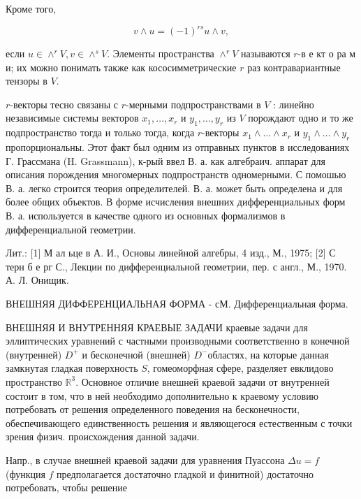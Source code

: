 \documentclass[10pt]{article}
\begin{document}
Кроме того,



\[

v \wedge u=(-1)^{r s} u \wedge v,

\]



если $u \in \wedge^{r} V, v \in \wedge^{s} V$. Элементы пространства $\wedge^{r} V$ называются $r$-в е кт о ра м и; их можно понимать также как кососимметрические $r$ раз контравариантные тензоры в $V$.



$r$-векторы тесно связаны с $r$-мерными подпространствами в $V$ : линейно независимые системы векторов $x_{1}, \ldots, x_{r}$ и $y_{1}, \ldots, y_{r}$ из $V$ порождают одно и то же подпространство тогда и только тогда, когда $r$-векторы $x_{1} \wedge \ldots \wedge x_{r}$ и $y_{1} \wedge \ldots \wedge y_{r}$ пропорциональны. Этот факт был одним из отправных пунктов в исследованиях Г. Грассмана (H. Grassmann), к-рый ввел В. а. как алгебраич. аппарат для описания порождения многомерных подпространств одномерными. С помошью В. а. легко строится теория определителей. В. а. может быть определена и для более общих объектов. В форме исчисления внешних дифференциальных форм В. а. используется в качестве одного из основных формализмов в дифференциальной геометрии.



Лит.: [1] М ал ьце в А. И., Основы линейной алгебры, 4 изд., М., 1975; [2] С терн б е рг С., Лекции по дифференциальной геометрии, пер. с англ., М., 1970. А. Л. Онищик.



ВНЕШНЯЯ ДИФФЕРЕНЦИАЛЬНАЯ ФОРМА - сМ. Дифференциальная форма.



ВНЕШНЯЯ И ВНУТРЕННЯЯ КРАЕВЫЕ ЗАДАЧИ краевые задачи для эллиптических уравнений с частными производными соответственно в конечной (внутренней) $D^{+}$ и бесконечной (внешней) $D^{-}$областях, на которые данная замкнутая гладкая поверхность $S$, гомеоморфная сфере, разделяет евклидово пространство $\mathbb{R}^{3}$. Основное отличие внешней краевой задачи от внутренней состоит в том, что в ней необходимо дополнительно к краевому условию потребовать от решения определенного поведения на бесконечности, обеспечивающего единственность решения и являющегося естественным с точки зрения физич. происхождения данной задачи.



Напр., в случае внешней краевой задачи для уравнения Пуассона $\Delta u=f$ (функция $f$ предполагается достаточно гладкой и финитной) достаточно потребовать, чтобы решение
\end{document}

